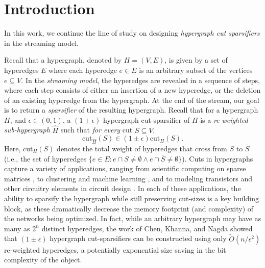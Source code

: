 \documentclass[11pt]{article}
\theoremstyle{definition}
\newcommand{\eps}{\epsilon}
\newcommand{\cut}{\text{cut}}
\begin{document}
\pagebreak

\tableofcontents



\pagebreak


\section{Introduction}

In this work, we continue the line of study on designing \emph{hypergraph cut sparsifiers} in the streaming model. 

Recall that a hypergraph, denoted by $H = (V, E)$, is given by a set of hyperedges $E$ where each hyperedge $e \in E$ is an arbitrary subset of the vertices $e \subseteq V$. In the \emph{streaming model}, the hyperedges are revealed in a sequence of steps, where each step consists of either an insertion of a new hyperedge, or the deletion of an existing hyperedge from the hypergraph. At the end of the stream, our goal is to return a \emph{sparsifier} of the resulting hypergraph. Recall that for a hypergraph $H$, and $\eps \in (0,1 )$, a $(1 \pm \eps)$ hypergraph cut-sparsifier of $H$ is a \emph{re-weighted sub-hypergraph} $\hat{H}$ such that \emph{for every} cut $S \subseteq V$, 
\[
\cut_{\hat{H}}(S) \in (1 \pm \eps) \cut_H(S).
\]
Here, $\cut_H(S)$ denotes the total weight of hyperedges that cross from $S$ to $\bar{S}$ (i.e., the set of hyperedges $\{e \in E: e \cap S \neq \emptyset \wedge e \cap \bar{S} \neq \emptyset\}$). 
Cuts in hypergraphs capture a variety of applications, ranging from scientific computing on sparse matrices \cite{BDKS16}, to clustering and machine learning \cite{YNYNLT19, ZHS06}, and to modeling transistors and other circuitry elements in circuit design \cite{AK95, DLaw73}. In each of these applications, the ability to sparsify the hypergraph while still preserving cut-sizes is a key building block, as these dramatically decrease the memory footprint (and complexity) of the networks being optimized. 
In fact, while an arbitrary hypergraph may have as many as $2^n$ distinct hyperedges, the work of Chen, Khanna, and Nagda \cite{CKN20} showed that $(1 \pm \eps)$ hypergraph cut-sparsifiers can be constructed using only $\widetilde{O}(n / \eps^2)$ re-weighted hyperedges, a potentially exponential size saving in the bit complexity of the object. 
\end{document}
